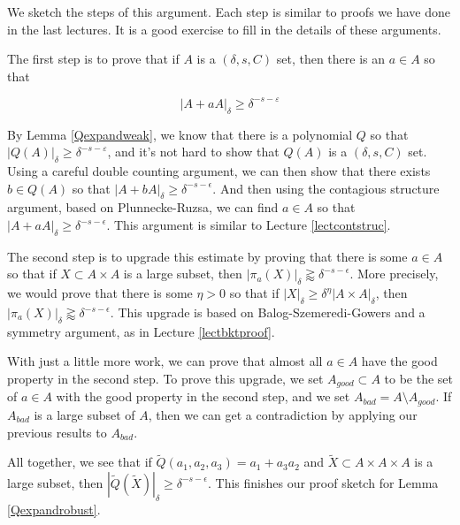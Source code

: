 \documentclass[12pt]{amsart}
\begin{document}
We sketch the steps of this argument.  Each step is similar to proofs we have done in the last lectures.   It is a good exercise to fill in the details of these arguments.

The first step is to prove that if $A$ is a $(\delta, s, C)$ set,  then there is an $a \in A$ so that

\begin{equation} \label{exp1}
|A + a A|_\delta \ge \delta^{-s - \varepsilon}
\end{equation}

\noindent By Lemma \ref{Qexpandweak},  we know that there is a polynomial $Q$ so that $|Q(A)|_\delta \ge \delta^{-s - \varepsilon}$,  and it's not hard to show that $Q(A)$ is a $(\delta, s, C)$ set.   Using a careful double counting argument,  we can then show that there exists $b \in Q(A)$ so that $|A + b A|_\delta \ge \delta^{-s - \epsilon}$.   And then using the contagious structure argument, based on Plunnecke-Ruzsa,  we can find $a \in A$ so that $|A + a A|_\delta \ge \delta^{-s - \epsilon}$.  This argument is similar to Lecture \ref{lectcontstruc}.

The second step is to upgrade this estimate by proving that there is some $a \in A$ so that if $X \subset A\times A$ is a large subset, then $|\pi_a(X)|_\delta \gtrapprox \delta^{-s - \epsilon}$.   More precisely,  we would prove that there is some $\eta > 0$ so that if $|X|_\delta \ge \delta^\eta |A \times A|_\delta$,  then $|\pi_a(X)|_\delta \gtrapprox \delta^{-s - \epsilon}$.   This upgrade is based on Balog-Szemeredi-Gowers and a symmetry argument,  as in Lecture \ref{lectbktproof}.

With just a little more work,  we can prove that almost all $a \in A$ have the good property in the second step.   To prove this upgrade,  we set $A_{good} \subset A$ to be the set of $a \in A$ with the good property in the second step,  and we set $A_{bad} = A \setminus A_{good}$.   If $A_{bad}$ is a large subset of $A$,  then we can get a contradiction by applying our previous results to $A_{bad}$.

All together,  we see that if $\tilde Q(a_1, a_2, a_3) = a_1 + a_3 a_2$ and $\tilde X \subset A \times A \times A$ is a large subset,  then $| \tilde Q(\tilde X) |_\delta \ge \delta^{-s - \epsilon}$.   This finishes our proof sketch for Lemma \ref{Qexpandrobust}.







\end{document}
